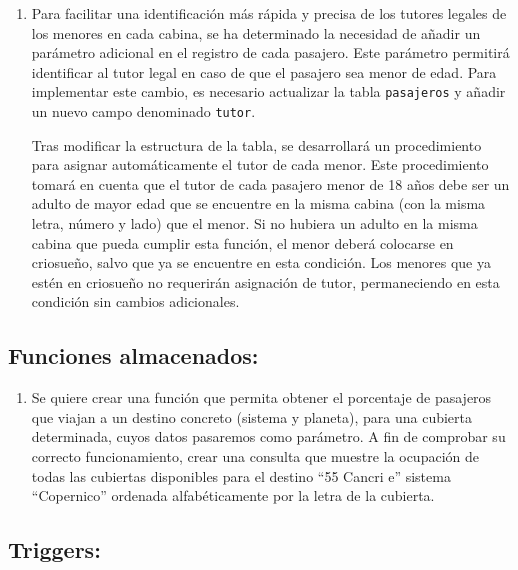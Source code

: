 \documentclass{db-practice}
\begin{document}
\begin{enumerate}
    \item Para facilitar una identificación más rápida y precisa de los tutores legales de los menores en cada cabina, se ha determinado la necesidad de añadir un parámetro adicional en el registro de cada pasajero. Este parámetro permitirá identificar al tutor legal en caso de que el pasajero sea menor de edad. Para implementar este cambio, es necesario actualizar la tabla \texttt{pasajeros} y añadir un nuevo campo denominado \texttt{tutor}.

    Tras modificar la estructura de la tabla, se desarrollará un procedimiento para asignar automáticamente el tutor de cada menor. Este procedimiento tomará en cuenta que el tutor de cada pasajero menor de 18 años debe ser un adulto de mayor edad que se encuentre en la misma cabina (con la misma letra, número y lado) que el menor. Si no hubiera un adulto en la misma cabina que pueda cumplir esta función, el menor deberá colocarse en criosueño, salvo que ya se encuentre en esta condición. Los menores que ya estén en criosueño no requerirán asignación de tutor, permaneciendo en esta condición sin cambios adicionales.
\end{enumerate}

\subsection*{Funciones almacenados:}

\begin{enumerate}
    \item Se quiere crear una función que permita obtener el porcentaje de pasajeros que viajan a un destino concreto (sistema y planeta), para una cubierta determinada, cuyos datos pasaremos como parámetro. A fin de comprobar su correcto funcionamiento, crear una consulta que muestre la ocupación de todas las cubiertas disponibles para el destino ``55 Cancri e'' sistema ``Copernico'' ordenada alfabéticamente por la letra de la cubierta.
\end{enumerate}

\subsection*{Triggers:}
\end{document}
